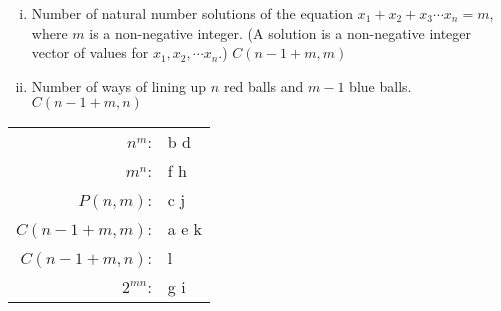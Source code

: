 \begin{problem}
\begin{enumerate}[(i)]
\item Number of natural number solutions of the equation $x_1 + x_2 + x_3
\cdots x_n = m$, where $m$ is a non-negative integer.  (A solution is
a non-negative integer vector of values for $x_1,x_2,\cdots x_n$.)
$C(n-1+m,m)$

\item Number of ways of lining up $n$ red balls and $m-1$ blue balls. $C(n-1+m,n)$

\end{enumerate}

\begin{solution}
\begin{center}
\begin{tabular}{rl}
$n^m$: & b d\\
$m^n$: & f h \\
$P(n,m)$: & c j \\
$C(n-1+m,m)$: & a e k \\
$C(n-1+m,n)$: & l \\
$2^{mn}$: &  g i\\
\end{tabular}
\end{center}
\end{solution}

\end{problem}



